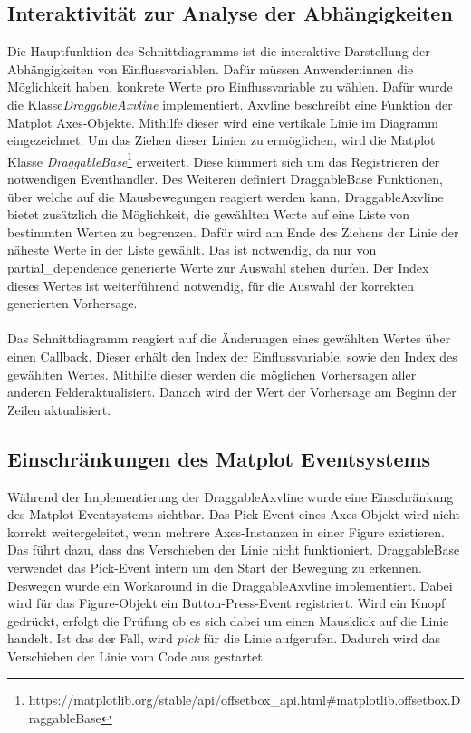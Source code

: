 \subsection{Interaktivität zur Analyse der Abhängigkeiten}
\label{subsec:pdp_interactivity}
\noindent Die Hauptfunktion des Schnittdiagramms ist die interaktive Darstellung der Abhängigkeiten von Einflussvariablen. Dafür müssen Anwender:innen die Möglichkeit haben, konkrete Werte pro Einflussvariable zu wählen. Dafür wurde die Klasse\linebreak \emph{DraggableAxvline} implementiert. Axvline beschreibt eine Funktion der Matplot Axes-Objekte. Mithilfe dieser wird eine vertikale Linie im Diagramm eingezeichnet. Um das Ziehen dieser Linien zu ermöglichen, wird die Matplot Klasse \emph{DraggableBase}\footnote{https://matplotlib.org/stable/api/offsetbox\_api.html\#matplotlib.offsetbox.DraggableBase} erweitert. Diese kümmert sich um das Registrieren der notwendigen Eventhandler. Des Weiteren definiert DraggableBase Funktionen, über welche auf die Mausbewegungen reagiert werden kann. DraggableAxvline bietet zusätzlich die Möglichkeit, die gewählten Werte auf eine Liste von bestimmten Werten zu begrenzen. Dafür wird am Ende des Ziehens der Linie der näheste Werte in der Liste gewählt. Das ist notwendig, da nur von partial\_dependence generierte Werte zur Auswahl stehen dürfen. Der Index dieses Wertes ist weiterführend notwendig, für die Auswahl der korrekten generierten Vorhersage.\\\\
\noindent Das Schnittdiagramm reagiert auf die Änderungen eines gewählten Wertes über einen Callback. Dieser erhält den Index der Einflussvariable, sowie den Index des gewählten Wertes. Mithilfe dieser werden die möglichen Vorhersagen aller anderen Felder\linebreak aktualisiert. Danach wird der Wert der Vorhersage am Beginn der Zeilen aktualisiert.

\subsection{Einschränkungen des Matplot Eventsystems}
\label{sec:pdp_matplot_einschraenkung}
\noindent Während der Implementierung der DraggableAxvline wurde eine Einschränkung des Matplot Eventsystems sichtbar. Das Pick-Event eines Axes-Objekt wird nicht korrekt weitergeleitet, wenn mehrere Axes-Instanzen in einer Figure existieren. Das führt dazu, dass das Verschieben der Linie nicht funktioniert. DraggableBase verwendet das Pick-Event intern um den Start der Bewegung zu erkennen. Deswegen wurde ein Workaround in die DraggableAxvline implementiert. Dabei wird für das Figure-Objekt ein Button-Press-Event registriert. Wird ein Knopf gedrückt, erfolgt die Prüfung ob es sich dabei um einen Mausklick auf die Linie handelt. Ist das der Fall, wird \emph{pick} für die Linie aufgerufen. Dadurch wird das Verschieben der Linie vom Code aus gestartet.

